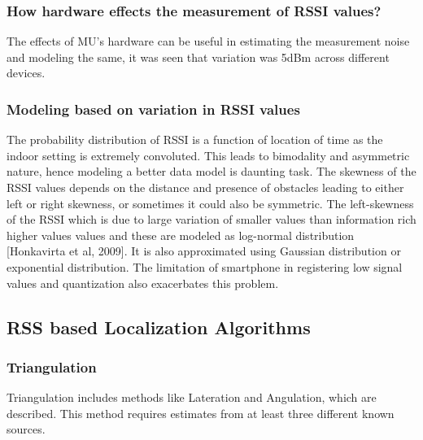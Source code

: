 \noindent
\subsubsection{How hardware effects the measurement of RSSI values?}
The effects of MU's hardware can be useful in estimating the measurement noise and modeling the same, it was seen that variation was 5dBm across different devices.\cite{deluca}

\subsubsection{Modeling based on variation in RSSI values}
The probability distribution of RSSI is a function of location of time as the indoor setting is extremely convoluted. This leads to bimodality and asymmetric nature, hence modeling a better data model is daunting task. The skewness of the RSSI values depends on the distance and presence of obstacles leading to either left or right skewness, or sometimes it could also be symmetric. The left-skewness of the RSSI which is due to large variation of smaller values than information rich higher values values and these are modeled as log-normal distribution [Honkavirta et al, 2009]. It is also approximated using Gaussian distribution or exponential distribution. The limitation of smartphone in registering low signal values and quantization also exacerbates this problem. 

\subsection{RSS based Localization Algorithms}
\subsubsection{Triangulation} 

Triangulation includes methods like Lateration and Angulation, which are described. This method requires estimates from at least three different known sources.

